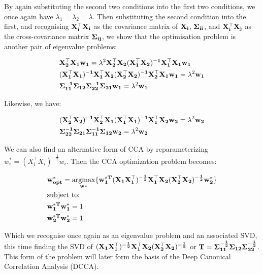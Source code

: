 By again substituting the second two conditions into the first two conditions, we once again have $\lambda_1=\lambda_2=\lambda$. Then substituting the second condition into the first, and recognising $\bold{X_i^{\top}X_i}$ as the covariance matrix of $\bold{X_i}$, $\bold{\Sigma_{ii}}$, and $\bold{X_i^{\top}X_j}$ as the cross-covariance matrix $\bold{\Sigma_{ij}}$, we show that the optimisation problem is another pair of eigenvalue problems:

\begin{align}
     & \bold{X_2^{\top}X_1w_1}=\lambda^2\bold{X_2^{\top}X_2(X_1^{\top}X_2)^{-1}X_1^{\top}X_1w_1}              \\
     & \bold{(X_1^{\top}X_1)^{-1}X_1^{\top}X_2(X_2^{\top}X_2)^{-1}X_2^{\top}X_1w_1}=\lambda^2\bold{w_1}\notag \\
     & \bold{\Sigma_{11}^{-1}\Sigma_{12}\Sigma_{22}^{-1}\Sigma_{21}w_1}=\lambda^2\bold{w_1}\notag             \\
\end{align}

Likewise, we have:

\begin{align}
     & \bold{(X_2^{\top}X_2)^{-1}X_2^{\top}X_1(X_1^{\top}X_1)^{-1}X_1^{\top}X_2w_2}=\lambda^2\bold{w_2}\notag \\
     & \bold{\Sigma_{22}^{-1}\Sigma_{21}\Sigma_{11}^{-1}\Sigma_{12}w_2}=\lambda^2\bold{w_2}\notag             \\
\end{align}

We can also find an alternative form of CCA by reparameterizing $w^*_i=(X_i^{\top}X_i)^{-\frac{1}{2}}w_i$. Then the CCA optimization problem becomes:

\begin{align}
     & \bold{w^*_{opt}}=\underset{\bold{w*}}{\mathrm{argmax}}\{ \bold{w^{*T}_1(X_1X_1^{\top})^{-\frac{1}{2}}X_1^{\top}X_2(X_2^{\top}X_2)^{-\frac{1}{2}}w^*_2\}} \\
     & \text{subject to:} \notag                                                                                                                                \\
     & \bold{w^{*T}_1w^*_1}=1 \notag                                                                                                                            \\
     & \bold{w^{*T}_2w^*_2}=1 \notag
\end{align}

Which we recognise once again as an eigenvalue problem and an associated SVD, this time finding the SVD of $\bold{(X_1X_1^{\top})^{-\frac{1}{2}}X_1^{\top}X_2(X_2^{\top}X_2)^{-\frac{1}{2}}}$ or $\bold{T}=\bold{\Sigma^{-\frac{1}{2}}_{11}\Sigma_{12}\Sigma^{-\frac{1}{2}}_{22}}$. This form of the problem will later form the basis of the Deep Canonical Correlation Analysis (DCCA).


